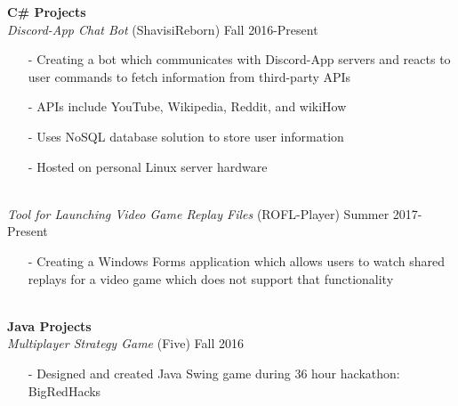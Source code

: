 \documentclass[10pt]{article}
\newcommand{\Indent}{\indent\indent}
\begin{document}
        \indent \small\textbf{C\# Projects}\\
            \Indent \small\textit{Discord-App Chat Bot}\small{ (ShavisiReborn)} \hfill \small{Fall 2016-Present}\indent\\
                \Indent\begin{minipage}{\dimexpr\textwidth-6cm}
                    \begin{itemize}[noitemsep, topsep=0pt]
                        \item[-] Creating a bot which communicates with Discord-App servers and reacts to user commands to fetch information from third-party APIs
                        \item[-] APIs include YouTube, Wikipedia, Reddit, and wikiHow
                        \item[-] Uses NoSQL database solution to store user information
                        \item[-] Hosted on personal Linux server hardware
                    \end{itemize}\vspace{0mm}
                \end{minipage}\\
            \Indent \small\textit{Tool for Launching Video Game Replay Files}\small{ (ROFL-Player)} \hfill \small{Summer 2017-Present}\indent\vspace{0.5mm}\\
                \Indent\begin{minipage}{\dimexpr\textwidth-6cm}
                    \begin{itemize}[noitemsep, topsep=0pt]
                        \item[-] Creating a Windows Forms application which allows users to watch shared replays for a video game which does not support that functionality
                    \end{itemize}\vspace{0mm}
                \end{minipage}\\
        \indent \small\textbf{Java Projects}\\
            \Indent \small\textit{Multiplayer Strategy Game}\small{ (Five)} \hfill \small{Fall 2016}\indent\vspace{0.5mm}\\
                \Indent\begin{minipage}{\dimexpr\textwidth-6cm}
                    \begin{itemize}[noitemsep, topsep=0pt]
                        \item[-] Designed and created Java Swing game during 36 hour hackathon: BigRedHacks
                    \end{itemize}\vspace{0mm}
                \end{minipage}\\
\end{document}
